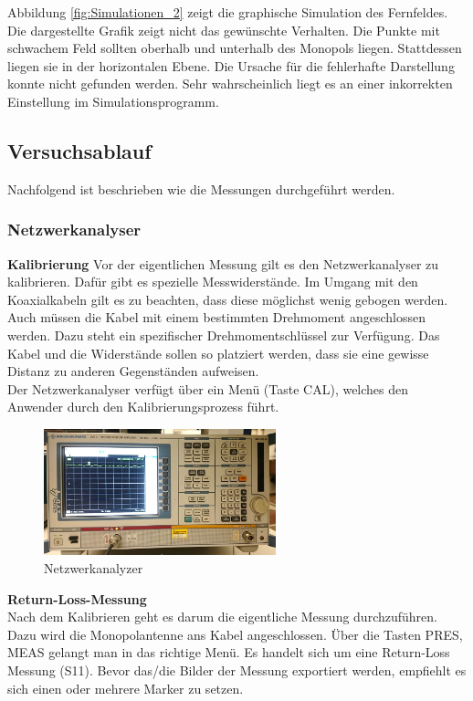 Abbildung \ref{fig:Simulationen_2} zeigt die graphische Simulation des Fernfeldes. Die dargestellte Grafik zeigt nicht das gewünschte Verhalten. Die Punkte mit schwachem Feld sollten oberhalb und unterhalb des Monopols liegen. Stattdessen liegen sie in der horizontalen Ebene. Die Ursache für die fehlerhafte Darstellung konnte nicht gefunden werden. Sehr wahrscheinlich liegt es an einer inkorrekten Einstellung im Simulationsprogramm.\\

\newpage
\subsection{Versuchsablauf}
Nachfolgend ist beschrieben wie die Messungen durchgeführt werden.

\subsubsection{Netzwerkanalyser}
\textbf{Kalibrierung}
Vor der eigentlichen Messung gilt es den Netzwerkanalyser zu kalibrieren. Dafür gibt es spezielle Messwiderstände. Im Umgang mit den Koaxialkabeln gilt es zu beachten, dass diese möglichst wenig gebogen werden. Auch müssen die Kabel mit einem bestimmten Drehmoment angeschlossen werden. Dazu steht ein spezifischer Drehmomentschlüssel zur Verfügung. Das Kabel und die Widerstände sollen so platziert werden, dass sie eine gewisse Distanz zu anderen Gegenständen aufweisen.\\
Der Netzwerkanalyser verfügt über ein Menü (Taste CAL), welches den Anwender durch den Kalibrierungsprozess führt. \\
\vspace{3mm}

\begin{figure}[htbp]
	\centering
	\includegraphics[width=0.6\textwidth]{pic/Messungen/NWA.JPG}
	\caption{Netzwerkanalyzer}
	\label{fig:Netzwerkanalyzer}
\end{figure}

\textbf{Return-Loss-Messung}\\
Nach dem Kalibrieren geht es darum die eigentliche Messung durchzuführen. Dazu wird die Monopolantenne ans Kabel angeschlossen. Über die Tasten PRES, MEAS gelangt man in das richtige Menü. Es handelt sich um eine Return-Loss Messung (S11). Bevor das/die Bilder der Messung exportiert werden, empfiehlt es sich einen oder mehrere Marker zu setzen.


